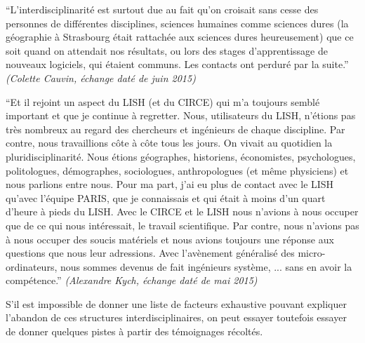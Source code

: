 \enquote{L’interdisciplinarité est surtout due au fait qu’on croisait sans cesse des personnes de différentes disciplines, sciences humaines comme sciences dures (la géographie à Strasbourg était rattachée aux sciences dures heureusement) que ce soit quand on attendait nos résultats, ou lors des stages d’apprentissage de nouveaux logiciels, qui étaient communs. Les contacts ont perduré par la suite.} \textit{(Colette Cauvin, échange daté de juin 2015)}

\enquote{Et il rejoint un aspect du LISH (et du CIRCE) qui m'a toujours semblé important et que je continue à regretter. Nous, utilisateurs du LISH, n'étions pas très nombreux au regard des chercheurs et ingénieurs de chaque discipline. Par contre, nous travaillions côte à côte tous les jours. On vivait au quotidien la pluridisciplinarité. Nous étions géographes, historiens, économistes, psychologues, politologues, démographes, sociologues, anthropologues (et même physiciens) et nous parlions entre nous. Pour ma part, j'ai eu plus de contact avec le LISH qu'avec l'équipe PARIS, que je connaissais et qui était à moins d'un quart d'heure à pieds du LISH. Avec le CIRCE et le LISH nous n'avions à nous occuper que de ce qui nous intéressait, le travail scientifique. Par contre, nous n'avions pas à nous occuper des soucis matériels et nous avions toujours une réponse aux questions que nous leur adressions. Avec l'avènement généralisé des micro-ordinateurs, nous sommes devenus de fait ingénieurs système, ... sans en avoir la compétence.} \textit{(Alexandre Kych, échange daté de mai 2015)}

S'il est impossible de donner une liste de facteurs exhaustive pouvant expliquer l'abandon de ces structures interdisciplinaires, on peut essayer toutefois essayer de donner quelques pistes à partir des témoignages récoltés.

